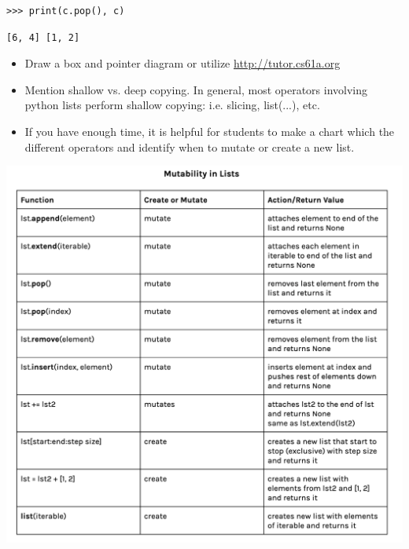 \begin{blocksection}
\begin{lstlisting}
>>> print(c.pop(), c)
\end{lstlisting}
\begin{solution}[0.25in]
\begin{lstlisting}
[6, 4] [1, 2]
\end{lstlisting}
\end{solution}
\end{blocksection}

\begin{blocksection}
\begin{guide}
\begin{itemize}
	\item Draw a box and pointer diagram or utilize \url {http://tutor.cs61a.org}
	\item Mention shallow vs. deep copying. In general, most operators involving python lists perform shallow copying: i.e. slicing, list(...), etc.
	\item If you have enough time, it is helpful for students to make a chart which the different operators and identify when to mutate or create a new list.
\end{itemize}
\includegraphics[width=.9\textwidth]{list-mutation.png}
\end{guide}
\end{blocksection}
